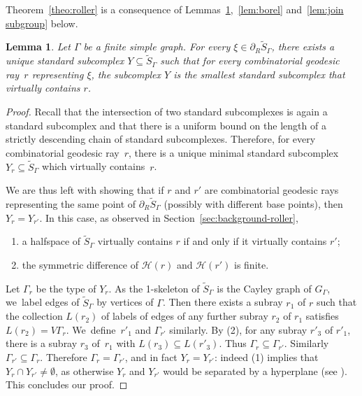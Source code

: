 \documentclass[JEP,XML,SOM,Unicode,NoFloatCountersInSection,published]{cedram}
\let\mathcal\mathscr
\theoremstyle{plain}
\newtheorem{lemma}[theo]{Lemma}
\theoremstyle{definition}
\begin{document}
Theorem~\ref{theo:roller} is a consequence of Lemmas~\ref{lemma:confined},~\ref{lem:borel} and~\ref{lem:join subgroup} below.

\begin{lemma}\label{lemma:confined}
Let $\Gamma$ be a finite simple graph. For every $\xi\in\partial_R\widetilde{S}_\Gamma$, there exists a unique standard subcomplex $Y\subseteq \widetilde{S}_\Gamma$ such that for every combinatorial geodesic ray~$r$ representing $\xi$, the subcomplex $Y$ is the smallest standard subcomplex that virtually contains $r$.
\end{lemma}

\begin{proof}
Recall that the intersection of two standard subcomplexes is again a standard subcomplex and that there is a uniform bound on the length of a strictly descending chain of standard subcomplexes. Therefore, for every combinatorial geodesic ray~$r$, there is a unique minimal standard subcomplex $Y_r\subseteq\widetilde{S}_\Gamma$ which virtually contains~$r$.

We are thus left with showing that if $r$ and $r'$ are combinatorial geodesic rays representing the same point of $\partial_R \widetilde{S}_\Gamma$ (possibly with different base points), then \hbox{$Y_r=Y_{r'}$}. In this case, as observed in Section~\ref{sec:background-roller},
\begin{enumerate}
\item[(1)] a halfspace of $\widetilde{S}_\Gamma$ virtually contains $r$ if and only if it virtually contains $r'$;
\item[(2)] the symmetric difference of $\mathcal{H}(r)$ and $\mathcal{H}(r')$ is finite.
\end{enumerate}
Let $\Gamma_r$ be the type of $Y_r$. As the 1-skeleton of $\widetilde{S}_\Gamma$ is the Cayley graph of $G_\Gamma$, we~label edges of $\widetilde{S}_\Gamma$ by vertices of $\Gamma$. Then there exists a subray $r_1$ of $r$ such that the collection $L(r_2)$ of labels of edges of any further subray $r_2$ of $r_1$ satisfies $L(r_2)=V\Gamma_r$. We~define~$r'_1$ and $\Gamma_{r'}$ similarly. By (2), for any subray $r'_3$ of $r'_1$, there is a subray $r_3$ of~$r_1$ with $L(r_3)\subseteq L(r'_3)$. Thus $\Gamma_r\subseteq \Gamma_{r'}$. Similarly $\Gamma_{r'}\subseteq \Gamma_r$. Therefore $\Gamma_r=\Gamma_{r'}$, and in fact $Y_r=Y_{r'}$: indeed (1) implies that $Y_r\cap Y_{r'}\neq\emptyset$, as otherwise $Y_r$ and $Y_{r'}$ would be separated by a hyperplane (see \cite[Cor.\,13.10]{haglund2008special}). This concludes our proof.
\end{proof}
\end{document}
